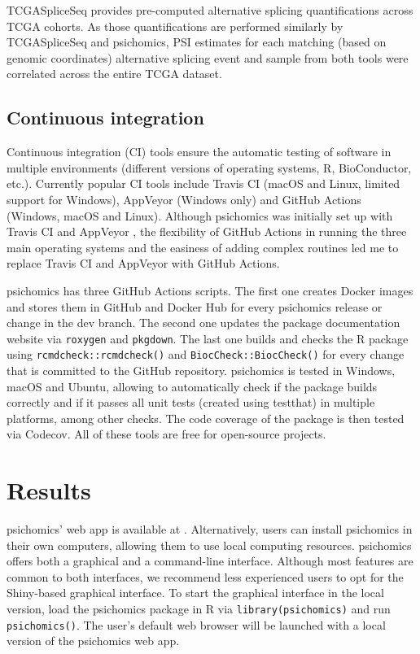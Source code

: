 TCGASpliceSeq \cite{ryan:2016tm} provides pre-computed alternative splicing quantifications across TCGA cohorts. As those quantifications are performed similarly by TCGASpliceSeq and psichomics, PSI estimates for each matching (based on genomic coordinates) alternative splicing event and sample from both tools were correlated across the entire TCGA dataset.

\subsection{Continuous integration}
\label{subsec:psichomics-ci}

Continuous integration (CI) tools ensure the automatic testing of software in multiple environments (different versions of operating systems, R, BioConductor, etc.). Currently popular CI tools include Travis CI (macOS and Linux, limited support for Windows), AppVeyor (Windows only) and GitHub Actions (Windows, macOS and Linux). Although psichomics was initially set up with Travis CI \cite{} and AppVeyor \cite{}, the flexibility of GitHub Actions \cite{} in running the three main operating systems and the easiness of adding complex routines led me to replace Travis CI and AppVeyor with GitHub Actions.

psichomics has three GitHub Actions scripts. The first one creates Docker images and stores them in GitHub and Docker Hub for every psichomics release or change in the dev branch. The second one updates the package documentation website via \texttt{roxygen} and \texttt{pkgdown}. The last one builds and checks the R package using \texttt{rcmdcheck::rcmdcheck()} and \texttt{BiocCheck::BiocCheck()} for every change that is committed to the GitHub repository. psichomics is tested in Windows, macOS and Ubuntu, allowing to automatically check if the package builds correctly and if it passes all unit tests (created using testthat) in multiple platforms, among other checks. The code coverage of the package is then tested via Codecov. All of these tools are free for open-source projects.

\section{Results}

psichomics' web app is available at . Alternatively, users can install psichomics in their own computers, allowing them to use local computing resources. psichomics offers both a graphical and a command-line interface. Although most features are common to both interfaces, we recommend less experienced users to opt for the Shiny-based graphical interface. To start the graphical interface in the local version, load the psichomics package in R via \texttt{library(psichomics)} and run \texttt{psichomics()}. The user's default web browser will be launched with a local version of the psichomics web app.

